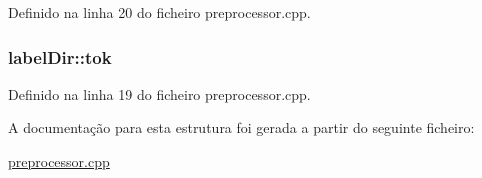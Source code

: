 Definido na linha 20 do ficheiro preprocessor.\-cpp.

\hypertarget{structlabel_dir_a833846ebac6b8b7a0ee80a6083093e25}{
\subsubsection[{tok}]{ label\-Dir\-::tok}}\label{structlabel_dir_a833846ebac6b8b7a0ee80a6083093e25}


Definido na linha 19 do ficheiro preprocessor.\-cpp.



A documentação para esta estrutura foi gerada a partir do seguinte ficheiro\-:\begin{DoxyCompactItemize}
\item 
\hyperlink{preprocessor_8cpp}{preprocessor.\-cpp}\end{DoxyCompactItemize}
